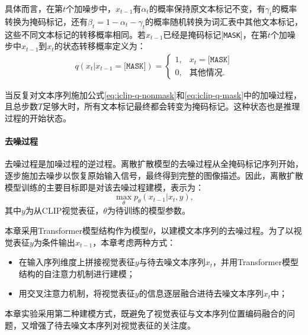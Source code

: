 具体而言，在第$t$个加噪步中，$x_{t-1}$有$\alpha_{t}$的概率保持原文本标记不变，有$\gamma_{t}$的概率转换为掩码标记，还有$\beta_{t}=1-\alpha_{t}-\gamma_{t}$的概率随机转换为词汇表中其他文本标记，这些不同文本标记的转移概率相同。若$x_{t-1}$已经是掩码标记[\texttt{MASK}]，在第$t$个加噪步中$x_{t-1}$到$x_t$的状态转移概率定义为：
\begin{align}
    q(x_t | x_{t - 1} = \texttt{[MASK]}) = 
    \begin{cases}
    1,& x_t =\texttt{[MASK]} \\
    0,& \text{其他情况}.
    \end{cases}
    \label{eq:iclip-q-mask}
\end{align}

当反复对文本序列施加公式\eqref{eq:iclip-q-nonmask}和\eqref{eq:iclip-q-mask}中的加噪过程，且总步数$T$足够大时，所有文本标记最终都会转变为掩码标记。这种状态也是推理过程的开始状态。


\paragraph{去噪过程} 
去噪过程是加噪过程的逆过程。离散扩散模型的去噪过程从全掩码标记序列开始，逐步施加去噪步以恢复原始输入信号，最终得到完整的图像描述。因此，离散扩散模型训练的主要目标即是对该去噪过程建模，表示为：
\begin{equation}
\max_{\theta} p_{\theta}(x_{t-1} | x_{t}, y),
  \label{eq:ddcap-target}
\end{equation}
其中$y$为从CLIP视觉表征，$\theta$为待训练的模型参数。

本章采用Transformer\cite{Transformer}模型结构作为模型$\theta$，以建模文本序列的去噪过程。为了以视觉表征$y$为条件输出$x_{t-1}$，本章考虑两种方式：
\begin{itemize}
    \item 在输入序列维度上拼接视觉表征$y$与待去噪文本序列$x_{t}$，并用Transformer模型结构的自注意力机制进行建模；
    \item 用交叉注意力机制，将视觉表征$y$的信息逐层融合进待去噪文本序列$x_{t}$中；
\end{itemize}
本章实验采用第二种建模方式，既避免了视觉表征与文本序列位置编码融合的问题，又增强了待去噪文本序列对视觉表征的关注度。

